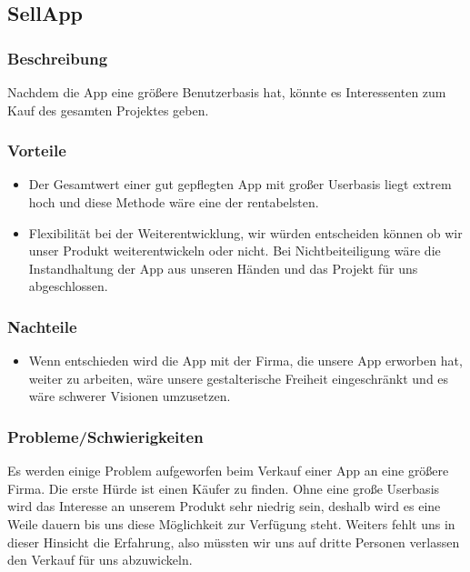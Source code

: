 \documentclass[FIPLY_base.tex]{subfiles}
\author{Gerald Irsiegler}
\date{26. Februar 2016}
\begin{document}
\subsection{SellApp}


\subsubsection{Beschreibung}
Nachdem die App eine größere Benutzerbasis hat, könnte es Interessenten zum Kauf des gesamten Projektes geben.


\subsubsection{Vorteile}
\begin{itemize}
\item Der Gesamtwert einer gut gepflegten App mit großer Userbasis liegt extrem hoch und diese Methode wäre eine der rentabelsten.
\item Flexibilität bei der Weiterentwicklung, wir würden entscheiden können ob wir unser Produkt weiterentwickeln oder nicht. Bei Nichtbeiteiligung wäre die Instandhaltung der App aus unseren Händen und das Projekt für uns abgeschlossen.
\end{itemize}

\subsubsection{Nachteile}
\begin{itemize}
\item Wenn entschieden wird die App mit der Firma, die unsere App erworben hat, weiter zu arbeiten, wäre unsere gestalterische Freiheit eingeschränkt und es wäre schwerer Visionen umzusetzen.
\end{itemize}


\subsubsection{Probleme/Schwierigkeiten}
Es werden einige Problem aufgeworfen beim Verkauf einer App an eine größere Firma. Die erste Hürde ist einen Käufer zu finden.
Ohne eine große Userbasis wird das Interesse an unserem Produkt sehr niedrig sein, deshalb wird es eine Weile dauern bis uns diese Möglichkeit zur Verfügung steht.
Weiters fehlt uns in dieser Hinsicht die Erfahrung, also müssten wir uns auf dritte Personen verlassen den Verkauf für uns abzuwickeln.
\end{document}
